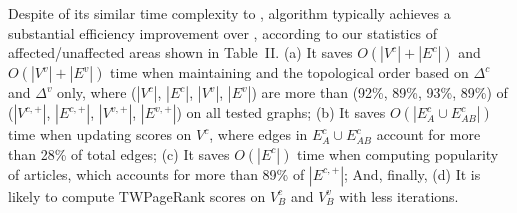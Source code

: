 Despite of its similar time complexity to \batensemble, algorithm \incensemble typically achieves a substantial efficiency improvement over \batensemble, according to our statistics of affected/unaffected areas shown in Table~II.
%
(a) It saves $O(|V^c|+|E^c|)$ and $O(|V^v|+|E^v|)$ time when maintaining \sccs and the topological order based on $\Delta^c$ and $\Delta^v$ only, where ($|V^c|$, $|E^c|$, $|V^v|$, $|E^v|$) are more than (92\%, 89\%, 93\%, 89\%) of ($|V^{c,+}|$, $|E^{c,+}|$, $|V^{v,+}|$, $|E^{v,+}|$) on all tested graphs;
(b) It saves $O(|E^c_A \cup E^c_{AB}|)$ time when updating scores on $V^c$, where edges in $E^c_A\cup E^c_{AB}$ account for more than 28\% of total edges;
(c) It saves $O(|E^c|)$ time when computing popularity of articles, which accounts for more than 89\% of $|E^{c,+}|$;
And, finally, (d) It is likely to compute TWPageRank scores on $V^c_B$ and $V^v_B$ with less iterations.







